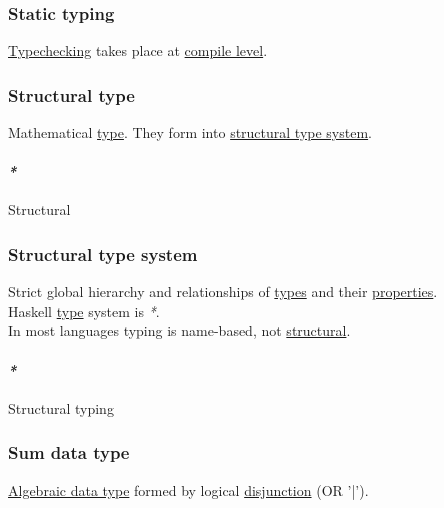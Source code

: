 \documentclass[11pt]{article}
\begin{document}
\subsubsection{\label{org2869cc0}Static typing}
\label{sec:org02e490a}
\hyperref[org84c913f]{Typechecking} takes place at \hyperref[org49a28ea]{compile level}.\\

\subsubsection{\label{org9b6fa1b}Structural type}
\label{sec:orgf331216}
Mathematical \hyperref[org4fbaeb8]{type}. They form into \hyperref[org6adbfe7]{structural type system}.\\

\paragraph{\emph{*}}
\label{sec:org41de8a5}

\label{org0ad5a4b}Structural\\

\subsubsection{\label{org6adbfe7}Structural type system}
\label{sec:org8faae5c}
Strict global hierarchy and relationships of \hyperref[org3927fd9]{types} and their \hyperref[org763ad6b]{properties}.\\
Haskell \hyperref[org4fbaeb8]{type} system is \emph{*}.\\
In most languages typing is name-based, not \hyperref[org0ad5a4b]{structural}.\\

\paragraph{\emph{*}}
\label{sec:org0b5006a}

\label{org4d9c5ef}Structural typing\\

\subsubsection{\label{org47bdbaf}Sum data type}
\label{sec:org23452d2}
\hyperref[orgeba275a]{Algebraic data type} formed by logical \hyperref[org29ff7d6]{disjunction} (OR '|').\\
\end{document}
